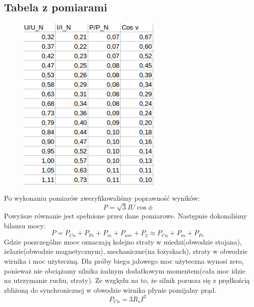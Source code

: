 \documentclass[12pt]{article}
\begin{document}
	\subsection{Tabela z pomiarami}
		\begin{figure}[H]
			\centering
			\includegraphics[width=7cm]{jalowy_tab}
		\end{figure}
Po wykonaniu pomiarów zweryfikowaliśmy poprawność wyników:
\begin{equation}
	P=\sqrt{3}IU\cos{\phi}
\end{equation}
Powyższe równanie jest spełnione przez dane pomiarowe.\newline
Następnie dokonaliśmy bilansu mocy:
\begin{equation}
	P=P_{Cu}+P_{Fe}+P_{m}+P_{wir} + P_2 \approx P_{Cu} + P_{m} + P_{Fe}
\end{equation}
Gdzie poszczególne moce oznaczają kolejno straty w miedzi(obwodzie stojana), żelazie(obwodzie magnetycznym), mechaniczne(na łożyskach), straty w obwodzie wirnika i moc użyteczną. Dla próby biegu jałowego moc użyteczna wynosi zero, ponieważ nie obciążamy silnika żadnym dodatkowym momentem(cała moc idzie na utrzymanie ruchu, straty). Ze względu na to, że silnik porusza się z prędkością zbliżoną do synchronicznej w obwodzie wirnika płynie pomijalny prąd.
\begin{equation}
	P_{Cu}=3R_sI^2
\end{equation}
\end{document}

